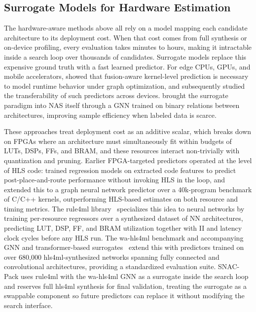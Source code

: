 \documentclass[11pt]{article}
\begin{document}
\subsection{Surrogate Models for Hardware Estimation}
The hardware-aware methods above all rely on a model mapping each candidate architecture to its deployment cost.
When that cost comes from full synthesis or on-device profiling, every evaluation takes minutes to hours, making it intractable inside a search loop over thousands of candidates.
Surrogate models replace this expensive ground truth with a fast learned predictor.
For edge CPUs, GPUs, and mobile accelerators, \citet{zhang2021nn} showed that fusion-aware kernel-level prediction is necessary to model runtime behavior under graph optimization, and \citet{akhauri2024latency} subsequently studied the transferability of such predictors across devices.
\citet{dudziak2020brp} brought the surrogate paradigm into NAS itself through a GNN trained on binary relations between architectures, improving sample efficiency when labeled data is scarce.

These approaches treat deployment cost as an additive scalar, which breaks down on FPGAs where an architecture must simultaneously fit within budgets of LUTs, DSPs, FFs, and BRAM, and these resources interact non-trivially with quantization and pruning.
Earlier FPGA-targeted predictors operated at the level of HLS code: \citet{10.1145/3240765.3264635} trained regression models on extracted code features to predict post-place-and-route performance without invoking HLS in the loop, and \citet{10.1145/3489517.3530408} extended this to a graph neural network predictor over a 40k-program benchmark of C/C++ kernels, outperforming HLS-based estimates on both resource and timing metrics.
The rule4ml library~\citep{Rahimifar_2025} specializes this idea to neural networks by training per-resource regressors over a synthesized dataset of NN architectures, predicting LUT, DSP, FF, and BRAM utilization together with II and latency clock cycles before any HLS run.
The wa-hls4ml benchmark and accompanying GNN and transformer-based surrogates~\citep{hawks2025wahls4mlbenchmarksurrogatemodels} extend this with predictors trained on over 680{,}000 hls4ml-synthesized networks spanning fully connected and convolutional architectures, providing a standardized evaluation suite. SNAC-Pack uses rule4ml with the wa-hls4ml GNN as a surrogate inside the search loop and reserves full hls4ml synthesis for final validation, treating the surrogate as a swappable component so future predictors can replace it without modifying the search interface.
\end{document}
